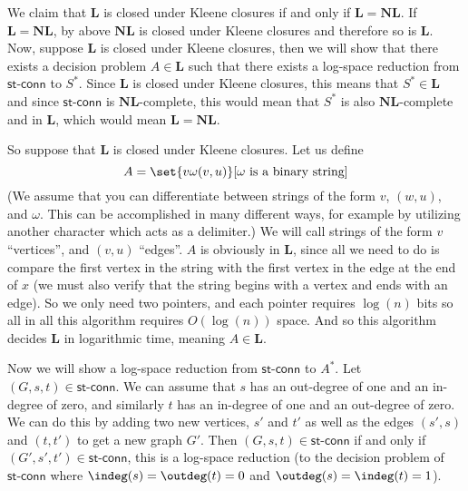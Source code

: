 \documentclass[10pt]{article}
\def\stconn{\textsf{st-conn}}
\def\L{\mathbf{L}}
\def\NL{\mathbf{NL}}
\begin{document}
    \item We claim that $\L$ is closed under Kleene closures if and only if $\L=\NL$.
    If $\L=\NL$, by above $\NL$ is closed under Kleene closures and therefore so is $\L$.
    Now, suppose $\L$ is closed under Kleene closures, then we will show that there exists a decision problem $A\in\L$ such that there exists a log-space reduction from $\stconn$ to $S^*$.
    Since $\L$ is closed under Kleene closures, this means that $S^*\in\L$ and since $\stconn$ is $\NL$-complete, this would mean that $S^*$ is also $\NL$-complete and in $\L$, which would mean $\L=\NL$.

    So suppose that $\L$ is closed under Kleene closures.
    Let us define
    \[ A = \set{v\omega(v,u)}[\text{$\omega$ is a binary string}] \]
    (We assume that you can differentiate between strings of the form $v$, $(w,u)$, and $\omega$.
    This can be accomplished in many different ways, for example by utilizing another character which acts as a delimiter.)
    We will call strings of the form $v$ ``vertices'', and $(v,u)$ ``edges''.
    $A$ is obviously in $\L$, since all we need to do is compare the first vertex in the string with the first vertex in the edge at the end of $x$ (we must also verify that the string begins with a vertex
    and ends with an edge).
    So we only need two pointers, and each pointer requires $\log(n)$ bits so all in all this algorithm requires $O(\log(n))$ space.
    And so this algorithm decides $\L$ in logarithmic time, meaning $A\in\L$.

    Now we will show a log-space reduction from $\stconn$ to $A^*$.
    Let $(G,s,t)\in\stconn$.
    We can assume that $s$ has an out-degree of one and an in-degree of zero, and similarly $t$ has an in-degree of one and an out-degree of zero.
    We can do this by adding two new vertices, $s'$ and $t'$ as well as the edges $(s',s)$ and $(t,t')$ to get a new graph $G'$.
    Then $(G,s,t)\in\stconn$ if and only if $(G',s',t')\in\stconn$, this is a log-space reduction (to the decision problem of $\stconn$ where $\indeg(s)=\outdeg(t)=0$ and $\outdeg(s)=\indeg(t)=1$).
\end{document}
